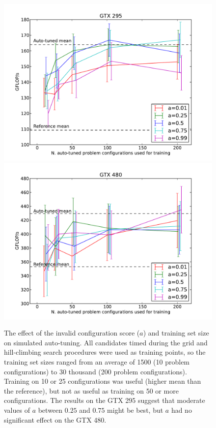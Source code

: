 \documentclass{sig-alternate}
\begin{document}
\begin{figure}
\centering
\includegraphics[scale=.42]{fig_ntrain_295.pdf}
\includegraphics[scale=.42]{fig_ntrain_480.pdf}
\caption{The effect of the invalid configuration score ($a$) and training set
size on simulated auto-tuning.
All candidates timed during the grid and
hill-climbing search procedures were used as training points, so the training
set sizes ranged from an average of 1500 (10 problem configurations) to 30
thousand (200 problem configurations).
Training on 10 or 25 configurations was useful (higher mean than the reference),
but not as useful as training on 50 or more configurations.
The results on the GTX 295 suggest that
moderate values of $a$ between $0.25$ and $0.75$ might be
best, but $a$ had no significant effect on the GTX 480.
}
\label{fig:fig_ntrain}
\end{figure}
\end{document}
